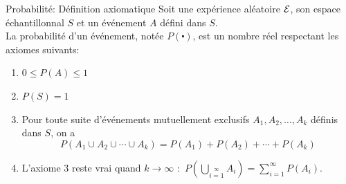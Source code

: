 \documentclass{BeamerTemplate}
\begin{document}
\begin{frame}[t]%

{\small  \begin{Boite}{Probabilité: Définition axiomatique}
  Soit une expérience aléatoire ${\cal{E}}$, son espace échantillonnal $S$ et un événement $A$ défini dans $S$. \\
  La \alert{probabilité d'un événement, notée $P(\centerdot)$}, est un nombre réel respectant les axiomes
  suivants:
  \begin{enumerate}
   \item $0\le P(A)\le 1$
   \item $P(S)=1$
   \item Pour toute suite d'événements \alert{mutuellement exclusifs}
   $A_1,A_2,\ldots,A_k$ définis dans $S$, on a
   $$P(A_1\cup A_2\cup \cdots \cup A_k)=P(A_1)+P(A_2)+\cdots+P(A_k)$$
   \item L'axiome 3 reste vrai quand $k\to\infty$ :\ $P\left(\bigcup_{i=1}\limits^\infty A_i\right)=\sum\limits_{i=1}^\infty P(A_i)$.
  \end{enumerate}
 \end{Boite}
}
\end{frame}
\end{document}
